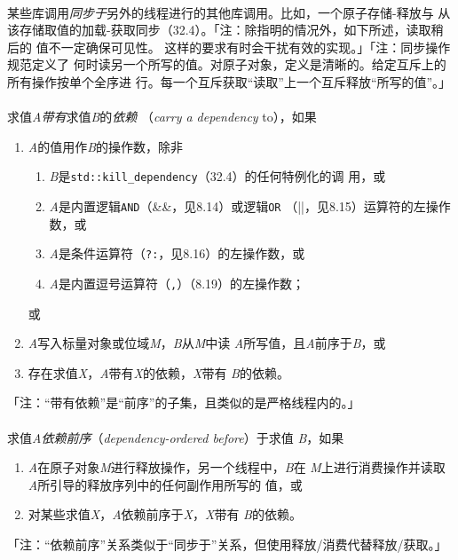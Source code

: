 \paragraph{}
某些库调用\textit{同步于}另外的线程进行的其他库调用。比如，一个原子存储-释放与
从该存储取值的加载-获取同步（32.4）。「注：除指明的情况外，如下所述，读取稍后的
值不一定确保可见性。 这样的要求有时会干扰有效的实现。」「注：同步操作规范定义了
何时读另一个所写的值。对原子对象，定义是清晰的。给定互斥上的所有操作按单个全序进
行。每一个互斥获取``读取''上一个互斥释放``所写的值''。」

\paragraph{}
求值\textit{A}\textit{带有}求值\textit{B}的\textit{依赖}
（\textit{carry a dependency} to），如果
\begin{enumerate}
  \item{\textit{A}的值用作\textit{B}的操作数，除非
      \begin{enumerate}
        \item{\textit{B}是\texttt{std::kill\_dependency}（32.4）的任何特例化的调
          用，或}
        \item{\textit{A}是内置逻辑\texttt{AND}（\&\&，见8.14）或逻辑\texttt{OR}
          （||，见8.15）运算符的左操作数，或}
        \item{\textit{A}是条件运算符（\texttt{?:}，见8.16）的左操作数，或}
        \item{\textit{A}是内置逗号运算符（\texttt{,}）（8.19）的左操作数；}
      \end{enumerate}
      或}
  \item{\textit{A}写入标量对象或位域\textit{M}，\textit{B}从\textit{M}中读
    \textit{A}所写值，且\textit{A}前序于\textit{B}，或}
  \item{存在求值\textit{X}，\textit{A}带有\textit{X}的依赖，\textit{X}带有
    \textit{B}的依赖。}
\end{enumerate}
「注：``带有依赖''是``前序''的子集，且类似的是严格线程内的。」

\paragraph{}
求值\textit{A}\textit{依赖前序}（\textit{dependency-ordered before}）于求值
\textit{B}，如果
\begin{enumerate}
  \item{\textit{A}在原子对象\textit{M}进行释放操作，另一个线程中，\textit{B}在
    \textit{M}上进行消费操作并读取\textit{A}所引导的释放序列中的任何副作用所写的
    值，或}
  \item{对某些求值\textit{X}，\textit{A}依赖前序于\textit{X}，\textit{X}带有
    \textit{B}的依赖。}
\end{enumerate}
「注：``依赖前序''关系类似于``同步于''关系，但使用释放/消费代替释放/获取。」

